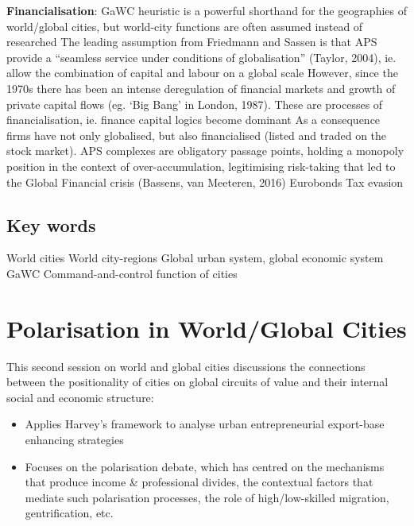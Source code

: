 \documentclass{article}
\begin{document}
\begin{outline}
	\1 \textbf{Financialisation}: GaWC heuristic is a powerful shorthand for the geographies of world/global cities, but world-city functions are often assumed instead of researched
		\2 The leading assumption from Friedmann and Sassen is that APS provide a ``seamless service under conditions of globalisation'' (Taylor, 2004), ie. allow the combination of capital and labour on a global scale
		\2 However, since the 1970s there has been an intense deregulation of financial markets and growth of private capital flows (eg. `Big Bang' in London, 1987). These are processes of financialisation, ie. finance capital logics become dominant
		\2 As a consequence firms have not only globalised, but also financialised (listed and traded on the stock market). APS complexes are obligatory passage points, holding a monopoly position in the context of over-accumulation, legitimising risk-taking that led to the Global Financial crisis (Bassens, van Meeteren, 2016)
		\2 Eurobonds
		\2 Tax evasion
\end{outline}

\subsection{Key words}

World cities
World city-regions
Global urban system, global economic system
GaWC
Command-and-control function of cities


\pagebreak\section{Polarisation in World/Global Cities}

This second session on world and global cities discussions the connections between the positionality of cities on global circuits of value and their internal social and economic structure:
\begin{itemize}
  \item Applies Harvey's framework to analyse urban  entrepreneurial export-base enhancing strategies
  \item Focuses on the polarisation debate, which has centred on the mechanisms that produce income \& professional divides, the contextual factors that mediate such polarisation processes, the role of high/low-skilled migration, gentrification, etc.
\end{itemize}
\end{document}
